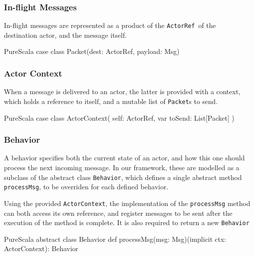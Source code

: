 \documentclass[a4paper,twoside]{article}
\newcommand{\InlineS}[1]{\lstinline[language=PureScala,basicstyle=\small\ttfamily,columns=fixed]|#1|}
\newcommand{\ActorRef}{\InlineS{ActorRef}\ }
\begin{document}
\vspace{-15pt}
\subsubsection*{In-flight Messages}

In-flight messages are represented as a product of the \ActorRef of the destination actor, and the message itself.

\begin{ShortCode}{PureScala}
case class Packet(dest: ActorRef, payload: Msg)
\end{ShortCode}

\vspace{-15pt}
\subsubsection*{Actor Context}

When a message is delivered to an actor, the latter is provided with a context,
which holds a reference to itself, and a mutable list of \InlineS{Packet}s to send.

\begin{ShortCode}{PureScala}
case class ActorContext(
  self: ActorRef,
  var toSend: List[Packet]
)
\end{ShortCode}

\vspace{-15pt}
\subsubsection*{Behavior}

A behavior specifies both the current state of an actor, and how this one should 
process the next incoming message. In our framework, these are modelled as a subclass 
of the abstract class \InlineS{Behavior}, which defines a single abstract method 
\InlineS{processMsg}, to be overriden for each defined behavior.

Using the provided \InlineS{ActorContext}, the implementation of the \InlineS{processMsg}
method can both access its own reference, and register messages to be sent after the
execution of the method is complete. It is also required to return a new \InlineS{Behavior}

\begin{ShortCode}{PureScala}
abstract class Behavior {
  def processMsg(msg: Msg)(implicit ctx: ActorContext): Behavior
}
\end{ShortCode}

\vspace{-15pt}
\end{document}
